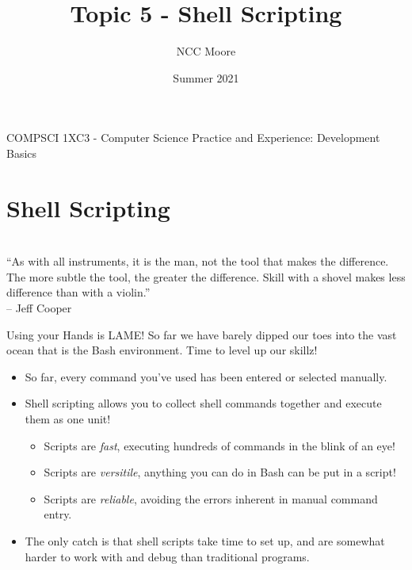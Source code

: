 \documentclass[11pt]{beamer}
\author{NCC Moore}
\title{Topic 5 - Shell Scripting}
\institute{McMaster University}
\date{Summer 2021}
\begin{document}
\begin{frame}
\center
COMPSCI 1XC3 - Computer Science Practice and Experience:
Development Basics
\titlepage
\end{frame}

\begin{frame}
\tableofcontents
\end{frame}

\section[Introduction]{Shell Scripting}
\begin{frame}
\center
{} \\
``As with all instruments, it is the man, not the tool that makes the difference. The more subtle the tool, the greater the difference. Skill with a shovel makes less difference than with a violin.''  \\
-- Jeff Cooper
\end{frame}

\begin{frame}{Using your Hands is LAME!}
So far we have barely dipped our toes into the vast ocean that is the Bash environment.  Time to level up our skillz!
\begin{itemize}
\item So far, every command you've used has been entered or selected manually.
\item Shell scripting allows you to collect shell commands together and execute them as one unit!  
	\begin{itemize}
	\item Scripts are \emph{fast}, executing hundreds of commands in the blink of an eye! 
	\item Scripts are \emph{versitile}, anything you can do in Bash can be put in a script! 
	\item Scripts are \emph{reliable}, avoiding the errors inherent in manual command entry.  
	\end{itemize}
\item The only catch is that shell scripts take time to set up, and are somewhat harder to work with and debug than traditional programs.  
\end{itemize}
\end{frame}
\end{document}
